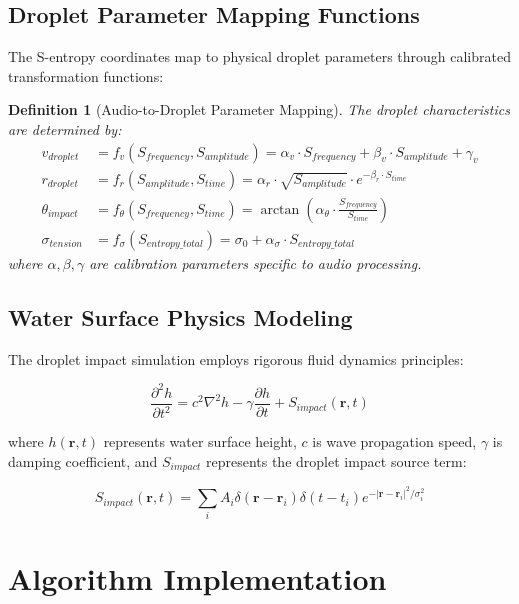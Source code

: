 \documentclass[12pt,a4paper]{article}
\newtheorem{definition}{Definition}
\begin{document}
\subsection{Droplet Parameter Mapping Functions}

The S-entropy coordinates map to physical droplet parameters through calibrated transformation functions:

\begin{definition}[Audio-to-Droplet Parameter Mapping]
The droplet characteristics are determined by:
\begin{align}
v_{droplet} &= f_v(S_{frequency}, S_{amplitude}) = \alpha_v \cdot S_{frequency} + \beta_v \cdot S_{amplitude} + \gamma_v \\
r_{droplet} &= f_r(S_{amplitude}, S_{time}) = \alpha_r \cdot \sqrt{S_{amplitude}} \cdot e^{-\beta_r \cdot S_{time}} \\
\theta_{impact} &= f_\theta(S_{frequency}, S_{time}) = \arctan(\alpha_\theta \cdot \frac{S_{frequency}}{S_{time}}) \\
\sigma_{tension} &= f_\sigma(S_{entropy\_total}) = \sigma_0 + \alpha_\sigma \cdot S_{entropy\_total}
\end{align}
where $\alpha, \beta, \gamma$ are calibration parameters specific to audio processing.
\end{definition}

\subsection{Water Surface Physics Modeling}

The droplet impact simulation employs rigorous fluid dynamics principles:

\begin{equation}
\frac{\partial^2 h}{\partial t^2} = c^2 \nabla^2 h - \gamma \frac{\partial h}{\partial t} + S_{impact}(\mathbf{r}, t)
\end{equation}

where $h(\mathbf{r}, t)$ represents water surface height, $c$ is wave propagation speed, $\gamma$ is damping coefficient, and $S_{impact}$ represents the droplet impact source term:

\begin{equation}
S_{impact}(\mathbf{r}, t) = \sum_i A_i \delta(\mathbf{r} - \mathbf{r}_i) \delta(t - t_i) e^{-|\mathbf{r} - \mathbf{r}_i|^2/\sigma_i^2}
\end{equation}

\section{Algorithm Implementation}
\end{document}
